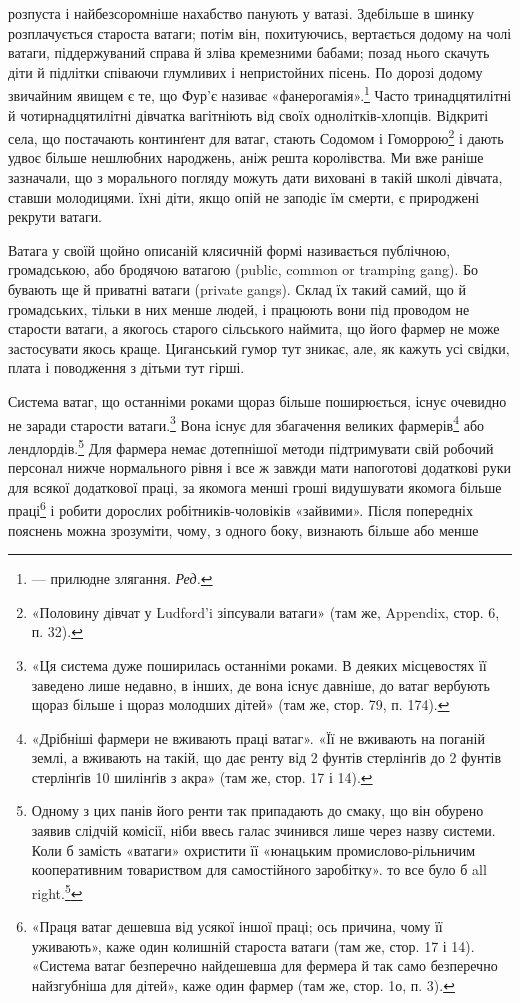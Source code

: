 \parcont{}  %
розпуста і найбезсоромніше нахабство панують у ватазі. Здебільше
в шинку розплачується староста ватаги; потім він, похитуючись,
вертається додому на чолі ватаги, піддержуваний справа
й зліва кремезними бабами; позад нього скачуть діти й підлітки
співаючи глумливих і непристойних пісень. По дорозі додому звичайним
явищем є те, що Фур’є називає «фанерогамія».\footnote*{
— прилюдне злягання. \emph{Ред.}
} Часто тринадцятилітні
й чотирнадцятилітні дівчатка вагітніють від своїх
однолітків-хлопців. Відкриті села, що постачають континґент
для ватаг, стають Содомом і Гоморрою\footnote{
«Половину дівчат у Ludford’i зіпсували ватаги» (там же, Appendix,
стор. 6, п. 32).
} і дають удвоє більше
нешлюбних народжень, аніж решта королівства. Ми вже раніше
зазначали, що з морального погляду можуть дати виховані в
такій школі дівчата, ставши молодицями. їхні діти, якщо опій
не заподіє їм смерти, є природжені рекрути ватаги.

Ватага у своїй щойно описаній клясичній формі називається
публічною, громадською, або бродячою ватагою (public, common
or tramping gang). Бо бувають ще й приватні ватаги (private
gangs). Склад їх такий самий, що й громадських, тільки в них
менше людей, і працюють вони під проводом не старости ватаги,
а якогось старого сільського наймита, що його фармер не може
застосувати якось краще. Циганський гумор тут зникає, але, як
кажуть усі свідки, плата і поводження з дітьми тут гірші.

Система ватаг, що останніми роками щораз більше поширюється,
існує очевидно не заради старости ватаги.\footnote{
«Ця система дуже поширилась останніми роками. В деяких місцевостях
її заведено лише недавно, в інших, де вона існує давніше, до ватаг
вербують щораз більше і щораз молодших дітей» (там же, стор. 79,
п. 174).
} Вона існує
для збагачення великих фармерів\footnote{
«Дрібніші фармери не вживають праці ватаг». «Її не вживають
на поганій землі, а вживають на такій, що дає ренту від 2 фунтів стерлінґів
до 2 фунтів стерлінґів 10 шилінґів з акра» (там же, стор. 17 і 14).
} або лендлордів.\footnote{
Одному з цих панів його ренти так припадають до смаку, що він
обурено заявив слідчій комісії, ніби ввесь галас зчинився лише через
назву системи. Коли б замість «ватаги» охристити її «юнацьким промислово-рільничим
кооперативним товариством для самостійного заробітку».
то все було б all right.\footnote*{
— гаразд. \emph{Ред.}
}
} Для фармера
немає дотепнішої методи підтримувати свій робочий персонал
нижче нормального рівня і все ж завжди мати напоготові
додаткові руки для всякої додаткової праці, за якомога менші
гроші видушувати якомога більше праці\footnote{
«Праця ватаг дешевша від усякої іншої праці; ось причина, чому
її уживають», каже один колишній староста ватаги (там же, стор. 17
і 14). «Система ватаг безперечно найдешевша для фермера й так само
безперечно найзгубніша для дітей», каже один фармер (там же, стор. 1о,
п. 3).
} і робити дорослих
робітників-чоловіків «зайвими». Після попередніх пояснень
можна зрозуміти, чому, з одного боку, визнають більше або менше
\parbreak{}  %
